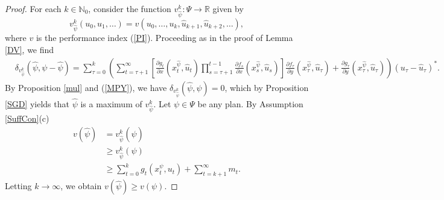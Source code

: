 \documentclass[3p]{elsarticle}
\newcommand{\rz}{\mathbb R}
\newcommand{\nat}{\mathbb N_0}
\begin{document}
	\begin{proof}
		For each $k\in\nat$, consider the function $v_{\hat{\psi}}^k:\Psi\to\rz$ given by $$v_{\hat\psi}^k(u_0,u_1,\dots)=v(u_0,\dots,u_{k},\hat u_{k+1},\hat u_{k+2},\dots),$$ where $v$ is the performance index (\ref{PI}).
		Proceeding as in the proof of Lemma \ref{DV}, we find
		\begin{align*}
		&\delta_{v_{\hat{\psi}}^k}(\hat\psi,\psi-\hat \psi)=\sum_{\tau=0}^k\left(\sum_{t=\tau+1}^\infty\left[ \frac{\partial g_t}{\partial x}(x_t^{\hat\psi},\hat u_t)\prod_{s=\tau+1}^{t-1}\frac{\partial f_s}{\partial x}(x_s^{\hat\psi},\hat u_s)\right]\frac{\partial f_\tau}{\partial y}(x_\tau^{\hat\psi},\hat u_\tau) +\frac{\partial g_\tau}{\partial y}(x_\tau^{\hat\psi},\hat u_\tau)\right)(u_\tau-\hat u_\tau)^*.
		\end{align*}
		By Proposition \ref{mul} and (\ref{MPY}), we have $\delta_{v_{\hat{\psi}}^k}(\hat\psi,\psi)=0$, which by Proposition \ref{SGD} yields that $\hat{\psi}$ is a maximum of $v^k_{\hat{\psi}}$. Let $\psi\in\Psi$ be any plan. By Assumption \ref{SuffCon}(c)
		\begin{align*}
		v(\hat{\psi})&=v_{\hat{\psi}}^k(\hat \psi)\\
		&\ge v_{\hat{\psi}}^k(\psi)\\
		&\ge \sum_{t=0}^k g_t(x_t^\psi,u_t) + \sum_{t=k+1}^\infty m_t.
		\end{align*}
		Letting $k\to\infty$, we obtain $v(\hat \psi)\ge v(\psi).$
	\end{proof}
	
\end{document}
